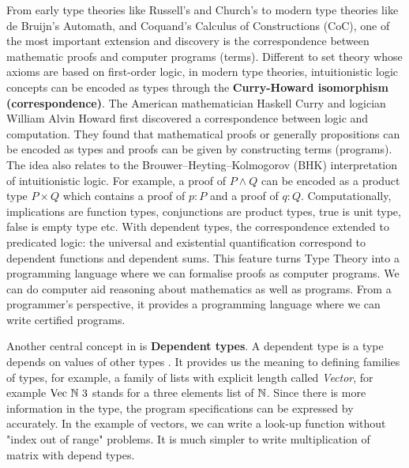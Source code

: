 From early type theories like Russell's and Church's to modern type theories like de Bruijn's Automath, \mltt and Coquand's Calculus of Constructions (CoC), one of the most important extension and discovery is the correspondence between mathematic proofs and computer programs (terms).
Different to set theory whose axioms are based on first-order logic, in modern type theories, intuitionistic logic concepts can be encoded as types through the 
\textbf{Curry-Howard isomorphism (correspondence)}.
The American mathematician Haskell Curry and logician William Alvin Howard first discovered a correspondence between logic and computation. They found that mathematical proofs or generally propositions can be encoded as types and proofs can be given by constructing terms (programs). The idea also relates to the Brouwer–Heyting–Kolmogorov (BHK) interpretation of intuitionistic logic. For example, a proof of $P \wedge Q$ can be encoded as a product type $P \times Q$ which contains a proof of $p : P$ and a proof of $q : Q$. Computationally, implications are function types, conjunctions are product types, true is unit type, false is empty type etc. 
With dependent types, the correspondence extended to predicated logic: the universal and existential quantification correspond to dependent functions and dependent sums. 
This feature turns Type Theory into a programming language where we can formalise proofs as computer programs. We can do computer aid reasoning about mathematics as well as programs. From a programmer's perspective, it provides a programming language where we can write certified programs.


Another central concept in \mltt is \textbf{Dependent types}\label{dpty}.
A dependent type is a type depends on values of other types \cite{dtw}. It provides us the meaning to defining families of types, for example, a family of lists with explicit length called \emph{Vector}, for example $\text{Vec} ~\mathbb{N} ~3$ stands for a three elements list of $\mathbb{N}$. Since there is more information in the type, the program specifications can be expressed by accurately. In the example of vectors, we can write a look-up function without "index out of range" problems. It is much simpler to write multiplication of matrix with depend types.


